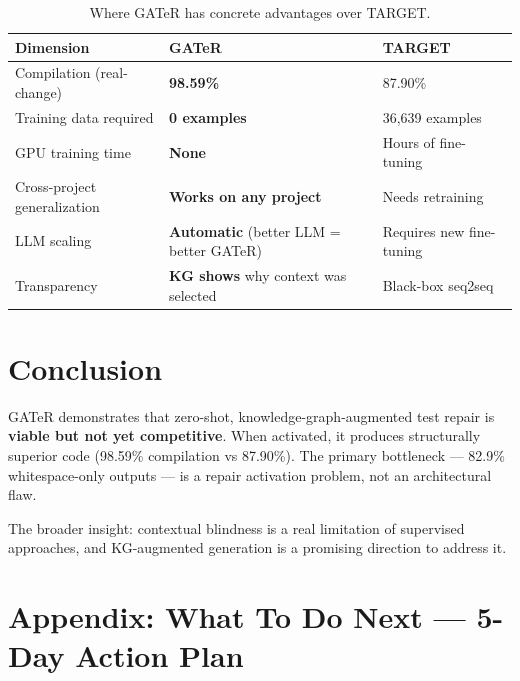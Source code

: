 \documentclass[11pt,a4paper]{article}
\begin{document}
\begin{table}[h!]
\centering\small
\caption{Where GATeR has concrete advantages over TARGET.}
\begin{tabularx}{\textwidth}{|l|X|X|}
\hline
\textbf{Dimension} & \textbf{GATeR} & \textbf{TARGET} \\
\hline
Compilation (real-change) & \textbf{98.59\%} & 87.90\% \\
\hline
Training data required & \textbf{0 examples} & 36,639 examples \\
\hline
GPU training time & \textbf{None} & Hours of fine-tuning \\
\hline
Cross-project generalization & \textbf{Works on any project} &
  Needs retraining \\
\hline
LLM scaling & \textbf{Automatic} (better LLM = better GATeR) &
  Requires new fine-tuning \\
\hline
Transparency & \textbf{KG shows} why context was selected &
  Black-box seq2seq \\
\hline
\end{tabularx}
\end{table}

\section{Conclusion}

GATeR demonstrates that zero-shot, knowledge-graph-augmented test
repair is \textbf{viable but not yet competitive}.  When activated,
it produces structurally superior code (98.59\% compilation vs 87.90\%).
The primary bottleneck --- 82.9\% whitespace-only outputs --- is a
repair activation problem, not an architectural flaw.

The broader insight: contextual blindness is a real limitation of
supervised approaches, and KG-augmented generation is a promising
direction to address it.

\newpage
\appendix
\section*{Appendix: What To Do Next --- 5-Day Action Plan}
\end{document}
